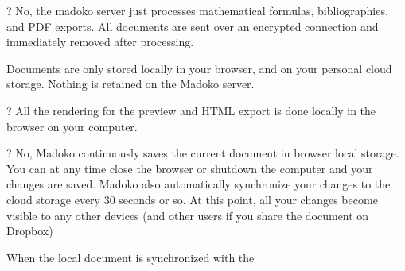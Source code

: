 \documentclass{book}
\begin{document}
\begin{mdOl}[class={loose},data-line={79}]%
\begin{mdLi}[data-line={79}]%
\begin{mdP}[data-line={79}]%
{}%
{}?%
{}\mdBr
{} No, the madoko server just processes mathematical formulas,
 bibliographies, and PDF exports. All documents are sent over an
 encrypted connection and immediately removed after processing.%
\end{mdP}%
\begin{mdP}[data-line={84}]%
{} Documents are only stored locally in your browser, and on your
 personal cloud storage. Nothing is retained on the Madoko server.%
\end{mdP}%
\end{mdLi}%
\begin{mdLi}[data-line={87}]%
\begin{mdP}[data-line={87}]%
{}%
{}?%
{}\mdBr
{} All the rendering for the preview and HTML export is done locally
 in the browser on your computer.%
\end{mdP}%
\begin{mdPre}[class={para-block,para-block},data-line={91}]%
\mdPrecode{}%
\end{mdPre}%
\end{mdLi}%
\begin{mdLi}[data-line={91}]%
\begin{mdP}[data-line={91}]%
{}%
{}?%
{}\mdBr
{} No, Madoko continuously saves the current document in browser local
 storage. You can at any time close the browser or shutdown the
 computer and your changes are saved. Madoko also automatically
 synchronize your changes to the cloud storage every 30 seconds or
 so. At this point, all your changes become visible to any other
 devices (and other users if you share the document on Dropbox)%
\end{mdP}%
\begin{mdP}[data-line={99}]%
{} When the local document is synchronized with the

\end{mdP}
\end{mdLi}
\end{mdOl}
\end{document}
